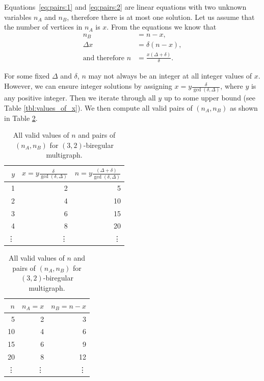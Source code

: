 Equations~\ref{eq:pairs:1} and \ref{eq:pairs:2} are linear equations with two unknown variables $n_A$ and $n_B$, therefore there is at most one solution.
Let us assume that the number of vertices in $n_A$ is $x$.
From the equations we know that
\begin{align*}
  n_B &= n-x,\\
  \Delta x &= \delta (n-x), \\
  \text{and therefore } n&=\frac{x(\Delta+\delta)}{\delta}.
\end{align*}

For some fixed $\Delta$ and $\delta$, $n$ may not always be an integer at all integer values of $x$.
However, we can ensure integer solutions by assigning $x=y\frac{\delta}{\gcd(\delta, \Delta)}$, where $y$ is any positive integer.
Then we iterate through all $y$ up to some upper bound (see Table \ref{tbl:values_of_x}).
We then compute all valid pairs of $(n_A, n_B)$ as shown in Table \ref{tbl:valid_pairs}.

\begin{table}[H]
  \parbox{.45\linewidth}{
  \centering
  \begin{tabular}{rrr}
    \toprule
    $y$&$x=y\frac{\delta}{\gcd(\delta, \Delta)}$&$n=y\frac{(\Delta + \delta)}{\gcd(\delta, \Delta)}$\\
    \midrule
    1 & 2 & 5 \\
    2 & 4 & 10 \\
    3 & 6 & 15 \\
    4 & 8 & 20 \\
    \vdots & \vdots & \vdots \\
    \bottomrule
  \end{tabular}
  \caption{
    All values of $y$, $x$, and $n$ for $(3,2)$-biregular multigraph.
  }
  \label{tbl:values_of_x}
  }
  \hfill
  \parbox{.45\linewidth}{
  \centering
  \begin{tabular}{rrr}
    \toprule
    $n$&$n_A=x$&$n_B=n-x$\\
    \midrule
    5 & 2 & 3   \\
    10 & 4 & 6  \\
    15 & 6 & 9  \\
    20 & 8 & 12 \\
    \vdots & \vdots & \vdots\\
    \bottomrule
  \end{tabular}
  \caption{
    All valid values of $n$ and pairs of $(n_A, n_B)$ for $(3,2)$-biregular multigraph.
  }
  \label{tbl:valid_pairs}
  }
\end{table}

